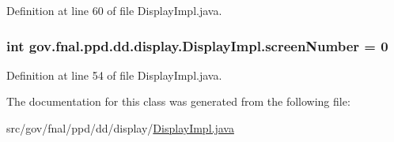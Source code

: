 Definition at line 60 of file Display\-Impl.\-java.

\hypertarget{classgov_1_1fnal_1_1ppd_1_1dd_1_1display_1_1DisplayImpl_ace620614bde13cee492129c27f38db4e}{
\subsubsection[{screen\-Number}]{\setlength{\rightskip}{0pt plus 5cm}int gov.\-fnal.\-ppd.\-dd.\-display.\-Display\-Impl.\-screen\-Number = 0\hspace{0.3cm}{\ttfamily [protected]}}}\label{classgov_1_1fnal_1_1ppd_1_1dd_1_1display_1_1DisplayImpl_ace620614bde13cee492129c27f38db4e}


Definition at line 54 of file Display\-Impl.\-java.



The documentation for this class was generated from the following file\-:\begin{DoxyCompactItemize}
\item 
src/gov/fnal/ppd/dd/display/\hyperlink{DisplayImpl_8java}{Display\-Impl.\-java}\end{DoxyCompactItemize}
